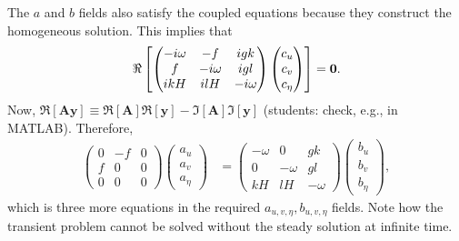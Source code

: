 \documentclass[10pt,reqno]{amsart}
\newcommand{\A}{{\mathbf A}}
\newcommand{\y}{{\mathbf y}}
\begin{document}
The $a$ and $b$ fields also satisfy the coupled equations because they construct the homogeneous solution.
This implies that
\begin{align}
\Re \left[
\begin{pmatrix}
- i \omega & -f & i g k \\
f & - i \omega &  i g l \\
i k H & i l H & - i \omega
\end{pmatrix}
\begin{pmatrix}
c_u \\ c_v \\ c_\eta
\end{pmatrix}
\right] = {\bf 0} .  
\end{align}
Now, $\Re \left[ \A \y \right] \equiv \Re \left[ \A \right] \Re \left[ \y \right] - \Im \left[ \A \right] \Im \left[ \y \right]$ (students: check, e.g., in MATLAB).
Therefore, 
\begin{align}
\begin{pmatrix}
0 & -f & 0 \\
f & 0 & 0 \\
0 & 0 & 0
\end{pmatrix}
\begin{pmatrix}
a_u \\ a_v \\ a_\eta
\end{pmatrix}
& = 
 \begin{pmatrix}
- \omega & 0 &  g k \\
0 & -  \omega &   g l \\
 k H & l H & - \omega
\end{pmatrix}
\begin{pmatrix}
b_u \\ b_v \\ b_\eta 
\end{pmatrix} ,  
\end{align}
which is three more equations in the required $a_{u, v, \eta}, b_{u, v, \eta}$ fields.
Note how the transient problem cannot be solved without the steady solution at infinite time.
\end{document}

